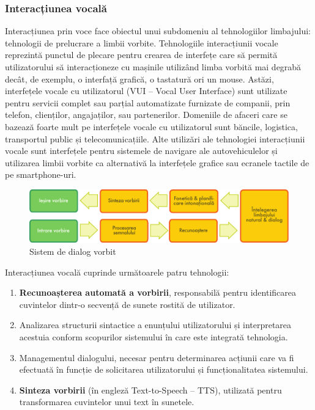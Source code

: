 \begin{multicols}{2}
\subsubsection{Interacțiunea vocală}

Interacțiunea prin voce face obiectul unui subdomeniu al tehnologiilor limbajului: tehnologii de prelucrare a limbii vorbite. Tehnologiile interacțiunii vocale reprezintă punctul de plecare pentru crearea de interfețe care să permită utilizatorului să interacționeze cu mașinile utilizând limba vorbită mai degrabă decât, de exemplu, o interfață grafică, o tastatură ori un mouse. Astăzi, interfețele vocale cu utilizatorul (VUI -- Vocal User Interface) sunt utilizate pentru servicii complet sau parțial automatizate furnizate de companii, prin telefon, clienților, angajaților, sau partenerilor. Domeniile de afaceri care se bazează foarte mult pe interfețele vocale cu utilizatorul sunt băncile, logistica, transportul public și telecomunicațiile. Alte utilizări ale tehnologiei interacțiunii vocale sunt interfețele pentru sistemele de navigare ale autovehiculelor și utilizarea limbii vorbite ca alternativă la interfețele grafice sau ecranele tactile de pe smartphone-uri.

\begin{figure}[htb]
\center 
\includegraphics[width=\textwidth]{../_media/romanian/simple_speech-based_dialogue_architecture}
\caption{Sistem de dialog vorbit}
\label{fig:dialoguearch_de}
\vspace{-15mm}
\end{figure}

Interacțiunea vocală cuprinde următoarele patru tehnologii:

\begin{enumerate}
\item \textbf{Recunoașterea automată a vorbirii}, responsabilă pentru identificarea cuvintelor dintr-o secvență de sunete rostită de utilizator.
\item Analizarea structurii sintactice a enunțului utilizatorului și interpretarea acestuia conform scopurilor sistemului în care este integrată tehnologia.
\item Managementul dialogului, necesar pentru determinarea acțiunii care va fi efectuată în funcție de solicitarea utilizatorului și funcționalitatea sistemului.
\item \textbf{Sinteza vorbirii} (în engleză Text-to-Speech -- TTS), utilizată pentru transformarea cuvintelor unui text în sunetele.
\end{enumerate}


\end{multicols}
